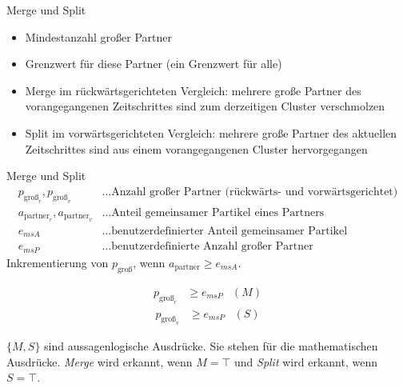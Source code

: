 \documentclass[10pt]{beamer}
\newcommand{\wichtig}[1]{\textit{#1}}
\begin{document}
\begin{frame}{Merge und Split}
	\begin{itemize}
		\item Mindestanzahl großer Partner
		\item Grenzwert für diese Partner (ein Grenzwert für alle)
		\item Merge im rückwärtsgerichteten Vergleich: mehrere große Partner des vorangegangenen Zeitschrittes sind zum derzeitigen Cluster verschmolzen
		\item Split im vorwärtsgerichteten Vergleich: mehrere große Partner des aktuellen Zeitschrittes sind aus einem vorangegangenen Cluster hervorgegangen
	\end{itemize}
\end{frame}

\begin{frame}{Merge und Split}
	\begin{align*}
		p_{\text{groß}_r}, p_{\text{groß}_v} &\ldots \text{Anzahl großer Partner (rückwärts- und vorwärtsgerichtet)}\\
		a_{\text{partner}_r}, a_{\text{partner}_v} &\ldots \text{Anteil gemeinsamer Partikel eines Partners}\\
		e_{msA} &\ldots \text{benutzerdefinierter Anteil gemeinsamer Partikel}\\
		e_{msP} &\ldots \text{benutzerdefinierte Anzahl großer Partner}
	\end{align*}
	Inkrementierung von $p_{\text{groß}}$, wenn $a_{\text{partner}} \ge e_{msA}$.
	
	\begin{equation}
	\begin{aligned}\label{eq:merge}
	p_{\text{groß}_r} &\ge e_{msP} &(M)
	\end{aligned}
	\end{equation}
	\begin{equation}
	\begin{aligned}\label{eq:split}
	p_{\text{groß}_v} &\ge e_{msP} &(S)
	\end{aligned}
	\end{equation}
	
	 $\{M,S\}$ sind aussagenlogische Ausdrücke. Sie stehen für die mathematischen Ausdrücke. \wichtig{Merge} wird erkannt, wenn $M = \top$ und \wichtig{Split} wird erkannt, wenn $S = \top$.
\end{frame}
\end{document}
